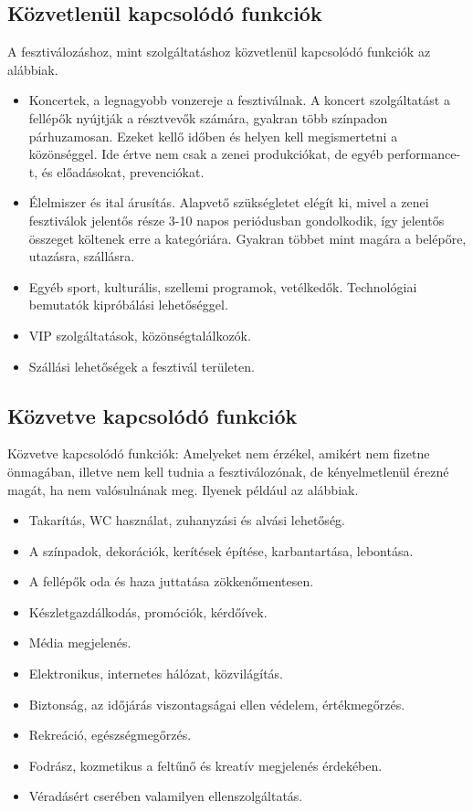 \subsection{Közvetlenül kapcsolódó funkciók}

A fesztiválozáshoz, mint szolgáltatáshoz közvetlenül kapcsolódó funkciók az alábbiak.
\begin{itemize}
\item Koncertek, a legnagyobb vonzereje a fesztiválnak. A koncert szolgáltatást a fellépők nyújtják a résztvevők számára, gyakran több színpadon párhuzamosan. Ezeket kellő időben és helyen kell megismertetni a közönséggel. Ide értve nem csak a zenei produkciókat, de egyéb performance-t, és előadásokat, prevenciókat.
\item Élelmiszer és ital árusítás. Alapvető szükségletet elégít ki, mivel a zenei fesztiválok jelentős része 3-10 napos periódusban gondolkodik, így jelentős összeget költenek erre a kategóriára. Gyakran többet mint magára a belépőre, utazásra, szállásra.
\item Egyéb sport, kulturális, szellemi programok, vetélkedők. Technológiai bemutatók kipróbálási lehetőséggel.
\item VIP szolgáltatások, közönségtalálkozók.
\item Szállási lehetőségek a fesztivál területen.
\end{itemize}

\subsection{Közvetve kapcsolódó funkciók}

Közvetve kapcsolódó funkciók: Amelyeket nem érzékel, amikért nem fizetne önmagában, illetve nem kell tudnia a fesztiválozónak, de kényelmetlenül érezné magát, ha nem valósulnának meg. Ilyenek például az alábbiak.
\begin{itemize}
\item Takarítás, WC használat, zuhanyzási és alvási lehetőség.
\item A színpadok, dekorációk, kerítések építése, karbantartása, lebontása.
\item A fellépők oda és haza juttatása zökkenőmentesen.
\item Készletgazdálkodás, promóciók, kérdőívek.
\item Média megjelenés.
\item Elektronikus, internetes hálózat, közvilágítás.
\item Biztonság, az időjárás viszontagságai ellen védelem, értékmegőrzés.
\item Rekreáció, egészségmegőrzés.
\item Fodrász, kozmetikus a feltűnő és kreatív megjelenés érdekében.
\item Véradásért cserében valamilyen ellenszolgáltatás.
\end{itemize}

